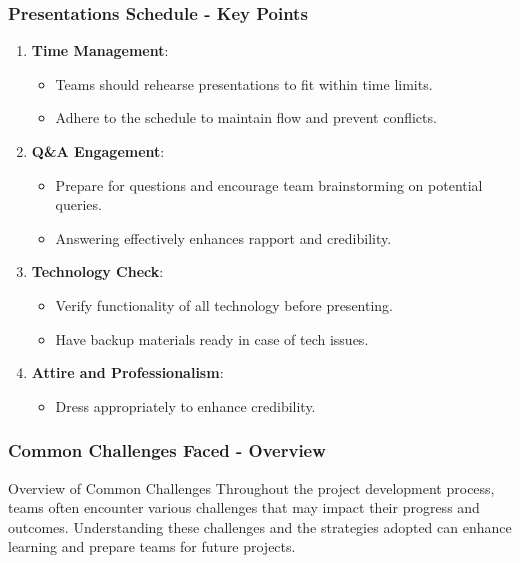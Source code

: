 \documentclass[aspectratio=169]{beamer}
\begin{document}
\begin{frame}[fragile]
    \frametitle{Presentations Schedule - Key Points}
    \begin{enumerate}
        \item \textbf{Time Management}:
        \begin{itemize}
            \item Teams should rehearse presentations to fit within time limits.
            \item Adhere to the schedule to maintain flow and prevent conflicts.
        \end{itemize}

        \item \textbf{Q\&A Engagement}:
        \begin{itemize}
            \item Prepare for questions and encourage team brainstorming on potential queries.
            \item Answering effectively enhances rapport and credibility.
        \end{itemize}
        
        \item \textbf{Technology Check}:
        \begin{itemize}
            \item Verify functionality of all technology before presenting.
            \item Have backup materials ready in case of tech issues.
        \end{itemize}

        \item \textbf{Attire and Professionalism}:
        \begin{itemize}
            \item Dress appropriately to enhance credibility.
        \end{itemize}
    \end{enumerate}
\end{frame}

\begin{frame}[fragile]
    \frametitle{Common Challenges Faced - Overview}
    \begin{block}{Overview of Common Challenges}
        Throughout the project development process, teams often encounter various challenges that may impact their progress and outcomes. Understanding these challenges and the strategies adopted can enhance learning and prepare teams for future projects.
    \end{block}
\end{frame}
\end{document}
